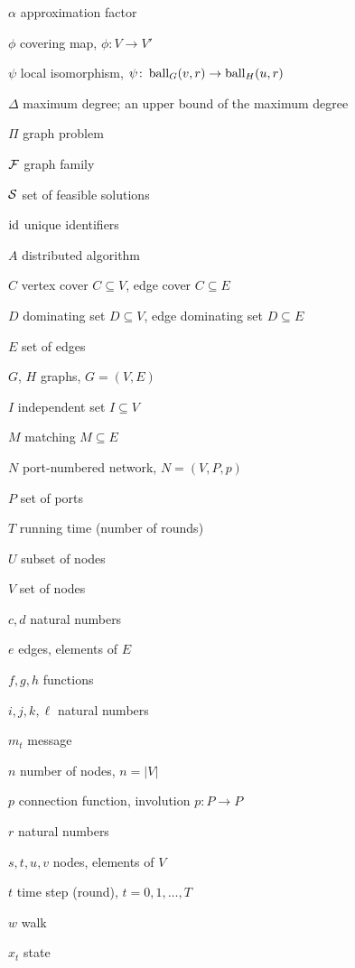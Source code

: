{\raggedright
\begin{notation}
    \item[$\alpha$] approximation factor
    \item[$\phi$] covering map, $\phi \colon V \to V'$
    \item[$\psi$] local isomorphism, $\psi \colon \operatorname{ball}_G(v,r) \to \operatorname{ball}_H(u,r)$
    \item[$\Delta$] maximum degree; an upper bound of the maximum degree
    \item[$\Pi$] graph problem
    \item[$\mathcal{F}$] graph family
    \item[$\mathcal{S}$] set of feasible solutions
    \item[$\operatorname{id}$] unique identifiers
    \item[$A$] distributed algorithm
    \item[$C$] vertex cover $C \subseteq V$, edge cover $C \subseteq E$
    \item[$D$] dominating set $D \subseteq V$, edge dominating set $D \subseteq E$
    \item[$E$] set of edges
    \item[$G$, $H$] graphs, $G = (V,E)$
    \item[$I$] independent set $I \subseteq V$
    \item[$M$] matching $M \subseteq E$
    \item[$N$] port-numbered network, $N = (V,P,p)$
    \item[$P$] set of ports
    \item[$T$] running time (number of rounds)
    \item[$U$] subset of nodes
    \item[$V$] set of nodes
    \item[$c,d$] natural numbers
    \item[$e$] edges, elements of $E$
    \item[$f,g,h$] functions
    \item[$i,j,k,\ell$] natural numbers
    \item[$m_t$] message
    \item[$n$] number of nodes, $n = |V|$
    \item[$p$] connection function, involution $p \colon P \to P$
    \item[$r$] natural numbers
    \item[$s,t,u,v$] nodes, elements of $V$
    \item[$t$] time step (round), $t = 0, 1, \dotsc, T$
    \item[$w$] walk
    \item[$x_t$] state
\end{notation}}

